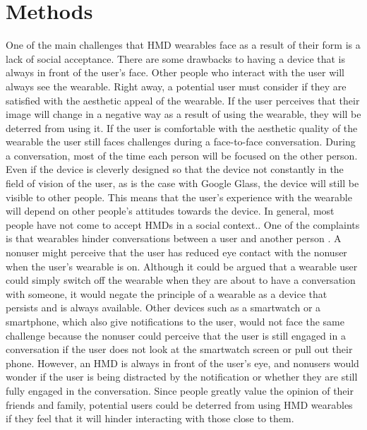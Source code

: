 \documentclass[11pt]{article}
\begin{document}
\section{Methods}

One of the main challenges that HMD wearables face as a result of their form is a lack of social acceptance. There are some drawbacks to having a device that is always in front of the user's face. Other people who interact with the user will always see the wearable. Right away, a potential user must consider if they are satisfied with the aesthetic appeal of the wearable. If the user perceives that their image will change in a negative way as a result of using the wearable, they will be deterred from using it\cite{WearableHumanView}. If the user is comfortable with the aesthetic quality of the wearable the user still faces challenges during a face-to-face conversation. During a conversation, most of the time each person will be focused on the other person. Even if the device is cleverly designed so that the device not constantly in the field of vision of the user, as is the case with Google Glass, the device will still be visible to other people. This means that the user's experience with the wearable will depend on other people's attitudes towards the device. In general, most people have not come to accept HMDs in a social context.\cite{negativeGlassReactions}. One of the complaints is that wearables hinder conversations between a user and another person \cite{wearableFaceToFace}. A nonuser might perceive that the user has reduced eye contact with the nonuser when the user's wearable is on. Although it could be argued that a wearable user could simply switch off the wearable when they are about to have a conversation with someone, it would negate the principle of a wearable as a device that persists and is always available. Other devices such as a smartwatch or a smartphone, which also give notifications to the user, would not face the same challenge because the nonuser could perceive that the user is still engaged in a conversation if the user does not look at the smartwatch screen or pull out their phone. However, an HMD is always in front of the user's eye, and nonusers would wonder if the user is being distracted by the notification or whether they are still fully engaged in the conversation. Since people greatly value the opinion of their friends and family, potential users could be deterred from using HMD wearables if they feel that it will hinder interacting with those close to them\cite{WearableHumanView}. 
\end{document}
